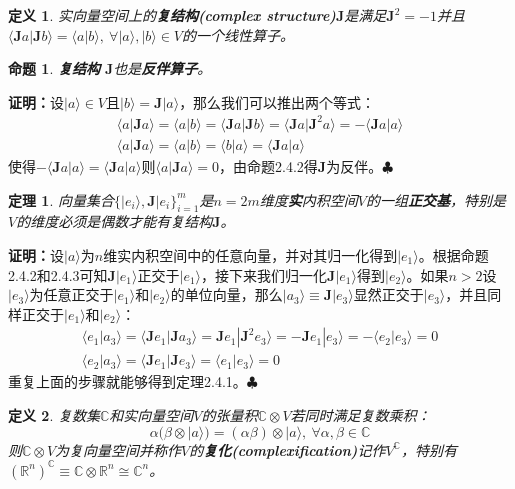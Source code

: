\documentclass[mathserif,hyperref,UTF8,openany,b5paper]{ctexbook}
\newtheorem{defn}{定义}[section]
\newtheorem{thm}{定理}[section]
\newtheorem{pro}{命题}[section]
\begin{document}
\begin{defn}
实向量空间上的\textbf{复结构(complex structure)}$\mathbf{J}$是满足$\mathbf{J}^2=-1$并且$\langle \mathbf{J}a|\mathbf{J}b\rangle=\langle a|b\rangle, 
\ \forall |a\rangle,|b\rangle\in V$的一个线性算子。
\end{defn}
\begin{pro}
\textbf{复结构} $\mathbf{J}$也是\textbf{反伴算子}。
\end{pro}
\textbf{证明：}设$|a\rangle\in V$且$|b\rangle=\mathbf{J}|a\rangle$，那么我们可以推出两个等式：
\begin{align}
\langle a|\mathbf{J}a\rangle=\langle a|b\rangle=\langle \mathbf{J}a|\mathbf{J}b\rangle= \langle \mathbf{J}a|\mathbf{J}^2a\rangle=-\langle \mathbf{J}a|a\rangle\\
\langle a|\mathbf{J}a\rangle = \langle a|b\rangle=\langle b|a\rangle=\langle \mathbf{J}a|a\rangle
\end{align}使得$-\langle \mathbf{J}a|a\rangle=\langle \mathbf{J}a|a\rangle$则$\langle a|\mathbf{J}a\rangle=0$，由命题2.4.2得$\mathbf{J}$为反伴。$\clubsuit$
\begin{thm}
向量集合$\{|e_i\rangle,\mathbf{J}|e_i\}^m_{i=1}$是$n=2m$维度\textbf{实}内积空间$V$的一组\textbf{正交基}，特别是$V$的维度必须是偶数才能有复结构$\mathbf{J}$。
\end{thm}
\textbf{证明：}设$|a\rangle$为$n$维实内积空间中的任意向量，并对其归一化得到$|e_1\rangle$。根据命题2.4.2和2.4.3可知$\mathbf{J}|e_1\rangle$正交于$|e_1\rangle$，接下来我们归一化$\mathbf{J}|e_1\rangle$得到$|e_2\rangle$。如果$n>2$设$|e_3\rangle$为任意正交于$|e_1\rangle$和$|e_2\rangle$的单位向量，那么$|a_3\rangle\equiv\mathbf{J}|e_3\rangle$显然正交于$|e_3\rangle$，并且同样正交于$|e_1\rangle$和$|e_2\rangle$：
\begin{align}
    \langle e_1|a_3\rangle= \langle \mathbf{J}e_1|\mathbf{J}a_3\rangle=\mathbf{J}e_1|\mathbf{J}^2 e_3\rangle=-\mathbf{J}e_1|e_3\rangle=-\langle e_2|e_3\rangle=0\\
    \langle e_2|a_3\rangle=\langle \mathbf{J}e_1|\mathbf{J}e_3\rangle=\langle e_1|e_3\rangle=0
\end{align}
重复上面的步骤就能够得到定理2.4.1。$\clubsuit$
\begin{defn}
复数集$\mathbb{C}$和实向量空间$V$的张量积$\mathbb{C}\otimes V$若同时满足复数乘积：
\begin{equation}
    \alpha(\beta\otimes|a\rangle)=(\alpha\beta)\otimes|a\rangle,\ \forall\alpha,\beta\in\mathbb{C}
\end{equation}
则$\mathbb{C}\otimes V$为复向量空间并称作$V$的\textbf{复化(complexification)}记作$V^{\mathbb{C}}$，特别有$(\mathbb{R}^n)^{\mathbb{C}}\equiv\mathbb{C}\otimes\mathbb{R}^n\cong\mathbb{C}^n$。
\end{defn}
\end{document}

